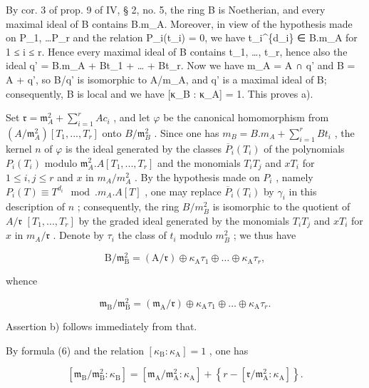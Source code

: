 By cor. 3 of prop. 9 of IV, § 2, no. 5, the ring B is Noetherian, and every maximal ideal of B contains B.m\_A. Moreover, in view of the hypothesis made on P\_1, \ldots P\_r and the relation P\_i(t\_i) = 0, we have t\_i\^{}\{d\_i\} ∈ B.m\_A for 1 ≤ i ≤ r. Hence every maximal ideal of B contains t\_1, \ldots, t\_r, hence also the ideal q' = B.m\_A + Bt\_1 + \ldots{} + Bt\_r. Now we have m\_A = A ∩ q' and B = A + q', so B/q' is isomorphic to A/m\_A, and q' is a maximal ideal of B; consequently, B is local and we have {[}κ\_B : κ\_A{]} = 1. This proves a).

Set \(\mathfrak{r} = \mathfrak{m}_{A}^{2} + \sum_{i=1}^{r} A c_i\) , and let \(\varphi\) be the canonical homomorphism from \((A/\mathfrak{m}_{A}^{2})[T_1, ..., T_r]\) onto \(B/\mathfrak{m}_{B}^{2}\) . Since one has \(m_B = B.m_A + \sum_{i=1}^{r} B t_i\) , the kernel \(n\) of \(\varphi\) is the ideal generated by the classes \(\overline{P}_i(T_i)\) of the polynomials \(P_i(T_i)\) modulo \(\mathfrak{m}_{A}^{2}.A[T_1, ..., T_r]\) and the monomials \(T_i T_j\) and \(x T_i\) for \(1 \leqslant i, j \leqslant r\) and \(x\) in \(m_A/m_A^2\) . By the hypothesis made on \(P_i\) , namely \(P_i(T) \equiv T^{d_i} \mod. m_A.A[T]\) , one may replace \(\overline{P}_i(T_i)\) by \(\gamma_i\) in this description of \(n\) ; consequently, the ring \(B/m_B^2\) is isomorphic to the quotient of \(A/\mathfrak{r}\) \([T_{1}, ..., T_{r}]\) by the graded ideal generated by the monomials \(T_{i}T_{j}\) and \(xT_{i}\) for \(x\) in \(m_A/\mathfrak{r}\) . Denote by \(\tau_{i}\) the class of \(t_{i}\) modulo \(m_{B}^{2}\) ; we thus have

\[
\mathrm{B} / \mathfrak {m} _ {\mathrm{B}} ^ {2} = (\mathrm{A} / \mathfrak {r}) \oplus \kappa_ {\mathrm{A}} \tau_ {1} \oplus \dots \oplus \kappa_ {\mathrm{A}} \tau_ {r},\tag{5}
\]

whence

\[
\mathfrak {m} _ {\mathrm{B}} / \mathfrak {m} _ {\mathrm{B}} ^ {2} = (\mathfrak {m} _ {\mathrm{A}} / \mathfrak {r}) \oplus \kappa_ {\mathrm{A}} \tau_ {1} \oplus \dots \oplus \kappa_ {\mathrm{A}} \tau_ {r}.\tag{6}
\]

Assertion b) follows immediately from that.

By formula (6) and the relation \([\kappa_{\mathrm{B}}:\kappa_{\mathrm{A}}] = 1\) , one has

\[
\left[ \mathfrak {m} _ {\mathrm{B}} / \mathfrak {m} _ {\mathrm{B}} ^ {2}: \kappa_ {\mathrm{B}} \right] = \left[ \mathfrak {m} _ {\mathrm{A}} / \mathfrak {m} _ {\mathrm{A}} ^ {2}: \kappa_ {\mathrm{A}} \right] + \left\{r - \left[ \mathfrak {r} / \mathfrak {m} _ {\mathrm{A}} ^ {2}: \kappa_ {\mathrm{A}} \right] \right\}.\tag{7}
\]

